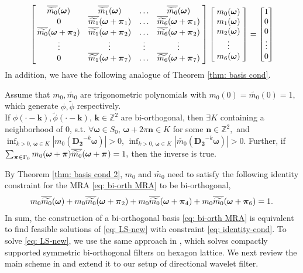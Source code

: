 \begin{align}\label{eq: LS-new}
\begin{bmatrix}
    \,\overline{\widetilde{m_{0}}}(\boldsymbol{\omega}) & \overline{\widetilde{m_{1}}}(\boldsymbol{\omega}) & \hdots & \overline{\widetilde{m_{6}}}(\boldsymbol{\omega})\;  \\
    \;0 & \overline{\widetilde{m_{1}}}(\boldsymbol{\omega} + \boldsymbol{\pi}_{1})  & \hdots  & \overline{\widetilde{m_{6}}}(\boldsymbol{\omega} + \boldsymbol{\pi}_{1})\; \\
    \,\overline{\widetilde{m_{0}}}(\boldsymbol{\omega} + \boldsymbol{\pi}_{2}) & \overline{\widetilde{m_{1}}}(\boldsymbol{\omega} + \boldsymbol{\pi}_{2}) & \hdots & \overline{\widetilde{m_{6}}}(\boldsymbol{\omega} + \boldsymbol{\pi}_{2})\;\\
    \;\vdots & \vdots & \vdots & \vdots \; \\
    \;0 & \overline{\widetilde{m_{1}}}(\boldsymbol{\omega} + \boldsymbol{\pi}_{7}) & \hdots & \overline{\widetilde{m_{6}}}(\boldsymbol{\omega} + \boldsymbol{\pi}_{7})\;
\end{bmatrix}
\begin{bmatrix}
\;m_{0}(\boldsymbol{\omega})\; \\
\;m_{1}(\boldsymbol{\omega})\; \\
\;m_{2}(\boldsymbol{\omega})\; \\
\; \vdots\; \\
\;m_{6}(\boldsymbol{\omega})\; 
\end{bmatrix} 
=
\begin{bmatrix}
1\\
0\\
0\\
\vdots \\
0
\end{bmatrix}
\end{align}
In addition, we have the following analogue of Theorem \ref{thm: basis cond}.
\begin{thm}\label{thm: basis cond 2}
Assume that $m_0, \widetilde{m_0}$ are trigonometric polynomials with $m_0(0)=\widetilde{m_0}(0) = 1$, which generate $\phi,\widetilde{\phi}$ respectively.\\
If $\phi(\cdot - \boldsymbol{k}),\widetilde{\phi}(\cdot - \boldsymbol{k}),\,\boldsymbol{k}\in\mathbb{Z}^2$ are bi-orthogonal, then $\exists K$ containing a neighborhood of 0, s.t. $\forall\boldsymbol{\omega}\in S_0,\,\boldsymbol{\omega}+2\pi\mathbf{n}\in K$ for some $\mathbf{n}\in\mathbb{Z}^2, $ and $\inf_{k>0,\,\boldsymbol{\omega}\in K}|m_0(\mathbf{D_2}^{-k}\boldsymbol{\omega})| >0$, $\inf_{k>0,\,\boldsymbol{\omega}\in K}|\widetilde{m_0}(\mathbf{D_2}^{-k}\boldsymbol{\omega})| >0$. 
 Further, if  $\sum_{\boldsymbol{\boldsymbol{\pi}}\in \Gamma_0} m_0(\boldsymbol{\omega}+\boldsymbol{\pi})\overline{\widetilde{m_{0}}}(\boldsymbol{\omega} + \boldsymbol{\pi}_{}) = 1,$ then the inverse is true.
\end{thm}
By Theorem \ref{thm: basis cond 2}, $m_0$ and $\widetilde{m_0}$ need to satisfy the following identity constraint for the MRA \eqref{eq: bi-orth MRA} to be bi-orthogonal,
\begin{align}\label{eq: identity-cond}
m_0\overline{\widetilde{m_{0}}}(\boldsymbol{\omega}) + m_0\overline{\widetilde{m_{0}}}(\boldsymbol{\omega} + \boldsymbol{\pi}_{2}) + m_0\overline{\widetilde{m_{0}}}(\boldsymbol{\omega} + \boldsymbol{\pi}_{4}) + m_0\overline{\widetilde{m_{0}}}(\boldsymbol{\omega} + \boldsymbol{\pi}_{6}) = 1.
\end{align}
In sum, the construction of a bi-orthogonal basis \eqref{eq: bi-orth MRA} is equivalent to find feasible solutions of \eqref{eq: LS-new} with constraint \eqref{eq: identity-cond}. To solve \eqref{eq: LS-new}, we use the same approach in \cite{cohen1993compactly}, which solves compactly supported symmetric bi-orthogonal filters on hexagon lattice. We next review the main scheme in \cite{cohen1993compactly} and extend it to our setup of directional wavelet filter.

